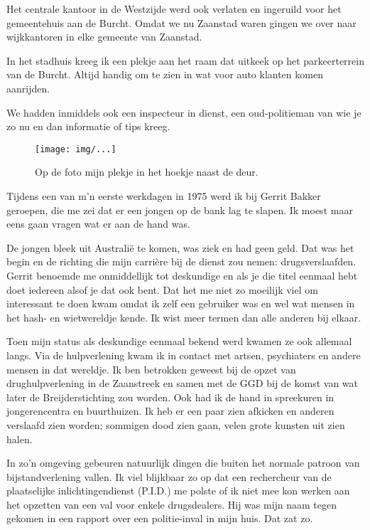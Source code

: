\documentclass[10pt,twoside,openright]{memoir}
\begin{document}
Het centrale kantoor in de Westzijde werd ook verlaten en ingeruild voor het gemeentehuis aan de Burcht. Omdat we nu Zaanstad waren gingen we over naar wijkkantoren in elke gemeente van Zaanstad. 

In het stadhuis kreeg ik een plekje aan het raam dat uitkeek op het parkeerterrein van de Burcht. Altijd handig om te zien in wat voor auto klanten komen aanrijden. 

We hadden inmiddels ook een inspecteur in dienst, een oud-politieman van wie je zo nu en dan informatie of tips kreeg. 

\begin{figure}[t]
\texttt{[image: img/...]}
\caption{Op de foto mijn plekje in het hoekje naast de deur.}
\end{figure}

Tijdens een van m’n eerste werkdagen in 1975 werd ik bij Gerrit Bakker geroepen, die me zei dat er een jongen op de bank lag te slapen. Ik moest maar eens gaan vragen wat er aan de hand was. 

De jongen bleek uit Australië te komen, was ziek en had geen geld. Dat was het begin en de richting die mijn carrière bij de dienst zou nemen: drugsverslaafden. Gerrit benoemde me onmiddellijk tot deskundige en als je die titel eenmaal hebt doet iedereen alsof je dat ook bent. Dat het me niet zo moeilijk viel om interessant te doen kwam omdat ik zelf een gebruiker was en wel wat mensen in het hash- en wietwereldje kende. Ik wist meer termen dan alle anderen bij elkaar. 

Toen mijn status als deskundige eenmaal bekend werd kwamen ze ook allemaal langs. Via de hulpverlening kwam ik in contact met artsen, psychiaters en andere mensen in dat wereldje. Ik ben betrokken geweest bij de opzet van drughulpverlening in de Zaanstreek en samen met de GGD bij de komst van wat later de Breijderstichting zou worden. Ook had ik de hand in spreekuren in jongerencentra en buurthuizen. Ik heb er een paar zien afkicken en anderen verslaafd zien worden; sommigen dood zien gaan, velen grote kunsten uit zien halen. 

In zo’n omgeving gebeuren natuurlijk dingen die buiten het normale patroon van bijstandverlening vallen. Ik viel blijkbaar zo op dat een rechercheur van de plaatselijke  inlichtingendienst (P.I.D.) me polste of ik niet mee kon werken aan het opzetten van een val voor enkele drugsdealers. Hij was mijn naam tegen gekomen in een rapport over een politie-inval in mijn huis. Dat zat zo. 
\end{document}
